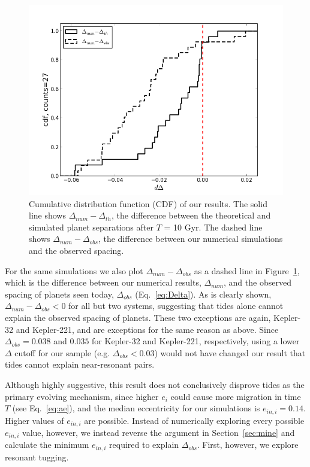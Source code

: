 \begin{figure}
\centerline{\includegraphics[trim=0cm 0cm 0.5cm 1cm, scale=0.48]{chap3/dDelta.png}}
\caption{Cumulative distribution function (CDF) of our results. The solid line shows $\Delta_{num} - \Delta_{th}$, the difference between the theoretical and simulated planet separations after $T$ = 10 Gyr. The dashed line shows $\Delta_{num} - \Delta_{obs}$, the difference between our numerical simulations and the observed \kep{} spacing.
}
\label{fig:th_v_num}
\end{figure}

For the same simulations we also plot $\Delta_{num} - \Delta_{obs}$ as a dashed line in Figure~\ref{fig:th_v_num}, which is the difference between our numerical results, $\Delta_{num}$, and the observed spacing of \kep{} planets seen today, $\Delta_{obs}$ (Eq.~\ref{eq:Delta}). 
As is clearly shown, $\Delta_{num} - \Delta_{obs} < 0$ for all but two systems, suggesting that tides alone cannot explain the observed spacing of \kep{} planets.
These two exceptions are again, Kepler-32 and Kepler-221, and are exceptions for the same reason as above. 
Since $\Delta_{obs} = 0.038$ and $0.035$ for Kepler-32 and Kepler-221, respectively, using a lower $\Delta$ cutoff for our \kep{} sample (e.g. $\Delta_{obs} < 0.03$) would not have changed our result that tides cannot explain near-resonant pairs.

Although highly suggestive, this result does not conclusively disprove tides as the primary evolving mechanism, since higher $e_i$ could cause more migration in time $T$ (see Eq.~\ref{eq:ae}), and the median eccentricity for our simulations is $e_{in,i} = 0.14$. 
Higher values of $e_{in,i}$ are possible. 
Instead of numerically exploring every possible $e_{in,i}$ value, however, we instead reverse the argument in Section~\ref{sec:mine} and calculate the minimum $e_{in,i}$ required to explain $\Delta_{obs}$.
First, however, we explore resonant tugging. 

